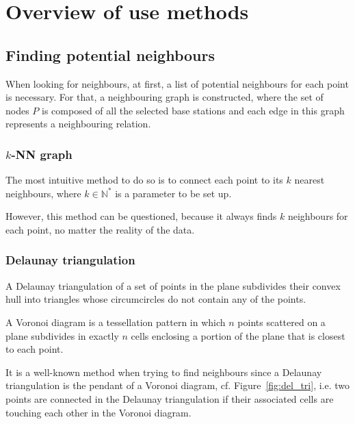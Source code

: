 \documentclass[lettersize,journal,english]{IEEEtran}
\begin{document}
\section{Overview of use methods\label{sec:overview}}
    \subsection{Finding potential neighbours}
        When looking for neighbours, at first, a list of potential neighbours for each point is necessary.
        For that, a neighbouring graph is constructed, where the set of nodes $P$ is composed of all the selected base stations and each edge in this graph represents a neighbouring relation.

        \subsubsection{$k$-NN graph}
            The most intuitive method to do so is to connect each point to its $k$ nearest neighbours, where $k \in \mathbb{N}^*$ is a parameter to be set up. 

            However, this method can be questioned, because it always finds $k$ neighbours for each point, no matter the reality of the data.

        \subsubsection{Delaunay triangulation}
            A Delaunay triangulation \cite{art_delaunay} of a set of points in the plane subdivides their convex hull into triangles whose circumcircles do not contain any of the points.

            A Voronoi diagram is a tessellation pattern in which $n$ points scattered on a plane subdivides in exactly $n$ cells enclosing a portion of the plane that is closest to each point. 

            It is a well-known method when trying to find neighbours \cite{delaunay_neighbor} since a Delaunay triangulation is the pendant of a Voronoi diagram, cf. Figure~\ref{fig:del_tri}, i.e. two points are connected in the
            Delaunay triangulation if their associated cells are touching each other in the Voronoi diagram.
\end{document}
